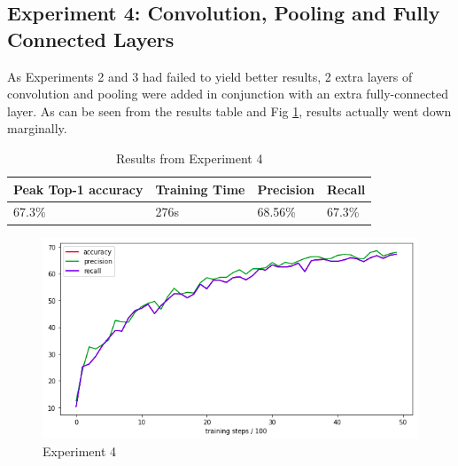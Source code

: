 \documentclass[12pt]{report}
\begin{document}
\newpage
\begin{flushleft}
\vspace{0.5cm}
\section{Experiment 4: Convolution, Pooling and Fully Connected Layers}
As Experiments 2 and 3 had failed to yield better results, 2 extra layers of convolution and pooling were added in conjunction with an extra fully-connected layer. As can be seen from the results table and Fig \ref{fig:experiment-4}, results actually went down marginally.

\vspace{0.5cm}
\begin{table}[ht!]
\begin{tabular}{llll}
\\ \hline
\multicolumn{1}{|l|}{Peak Top-1 accuracy} & \multicolumn{1}{l|}{Training Time} & \multicolumn{1}{l|}{Precision} & \multicolumn{1}{l|}{Recall} \\ \hline
\multicolumn{1}{|l|}{67.3\%}              & \multicolumn{1}{l|}{276s}          & \multicolumn{1}{l|}{68.56\%}   & \multicolumn{1}{l|}{67.3\%} \\ \hline
\end{tabular}
\caption{Results from Experiment 4}
\end{table}

\vspace{0.5cm}
\begin{figure}[ht!]
	\centering
	\includegraphics[width=12cm]{experiment-4}
	\caption{Experiment 4}
	\label{fig:experiment-4}
\end{figure}
\end{flushleft}
\end{document}
